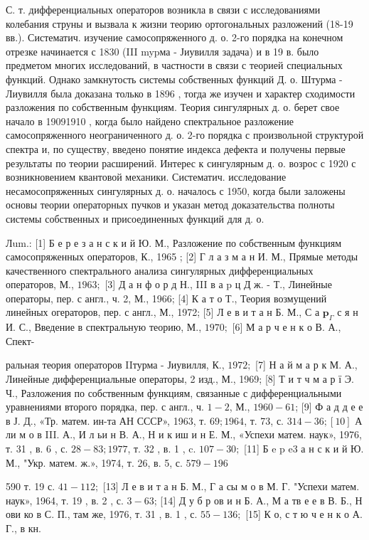 \documentclass[10pt]{article}
\begin{document}
С. т. дифференциальных операторов возникла в связи с исследованиями колебания струны и вызвала к жизни теорию ортогональных разложений (18-19 вв.). Систематич. изучение самосопряженного д. о. 2-го порядка на конечном отрезке начинается с 1830 (III mypма - Јиувилля задача) и в 19 в. было предметом многих исследований, в частности в связи с теорией специальных функций. Однако замкнутость системы собственных функций Д. о. Штурма - Лиувилля была доказана только в 1896 , тогда же изучен и характер сходимости разложения по собственным функциям. Теория сингулярных д. о. берет свое начало в 19091910 , когда было найдено спектральное разложение самосопряженного неограниченного д. о. 2-го порядка с произвольной структурой спектра и, по существу, введено понятие индекса дефекта и получены первые результаты по теории расширений. Интерес к сингулярным д. о. возрос с 1920 с возникновением квантовой механики. Систематич. исследование несамосопряженных сингулярных д. о. началось с 1950, когда были заложены основы теории операторных пучков и указан метод доказательства полноты системы собственных и присоединенных функций для д. о.



Лum.: [1] Б е р е з а н с к и й Ю. М., Разложение по собственным функциям самосопряженных операторов, К., 1965 ; [2] Г л а з м а н И. М., Прямые методы качественного спектрального анализа сингулярных дифференциальных операторов, М., $1963 ;$ [3] Д а н ф о р д Н., III в а p ц Д ж. - Т., Линейные операторы, пер. с англ., ч. 2, М., 1966; [4] К а т о Т., Теория возмущений линейных огераторов, пер. с англ., М., 1972; [5] Л е в и т а н Б. М., С а $\boldsymbol{p}_{\Gamma}$ с я н И. С., Введение в спектральную теорию, М., $1970 ;$ [6] М а р ч е н к о В. А., Спект-

ральная теория операторов IIтурма - Јиувилля, К., $1972 ;$ [7] Н а й м а р к М. А., Линейные дифференциальные операторы, 2 изд., М., 1969; [8] Т и т ч м а р ї Э. Ч., Разложения по собственным функциям, связанные с дифференциальными уравнениями второго порядка, пер. с англ., ч. $1-2$, М., $1960-61$; [9] Ф а д д е е в Ј. Д., «Тр. матем. ин-та АН СССР», 1963, т. $69 ; 1964$, т. 73, с. $314-36 ;[10]$ А ли м о в III. А., И л ьи н В. А., Н и к иш и н Е. М., «Успехи матем. наук», 1976, т. 31 , в. 6 , с. $28-83 ; 1977$, т. 32 , в. 1 , c. $107-30 ;$ [11] Б e p e3 а н с к и й Ю. М., "Укр. матем. ж.», 1974, т. 26, в. 5, с. $579-196$

590 т. 19 с. $41-112 ;$ [13] Л е в и т а н Б. М., $Г$ а сы м о в М. Г. "Успехи матем. наук», 1964, т. 19 , в. 2 , с. $3-63$; [14] Д у б р ов и н Б. А., М а тв е е в В. Б., Н ови ко в С. П., там же, 1976, т. 31 , в. 1 , с. $55-136 ;$ [15] К о, с т ю ч е н к о А. Г., в кн.
\end{document}
